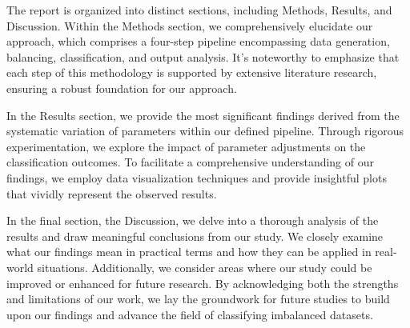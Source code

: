 The report is organized into distinct sections, including Methods, Results, and Discussion. Within the Methods section, we comprehensively elucidate our approach, which comprises a four-step pipeline encompassing data generation, balancing, classification, and output analysis. It’s noteworthy to emphasize that each step of this methodology is supported by extensive literature research, ensuring a robust foundation for our approach.

In the Results section, we provide the most significant findings derived from the systematic variation of parameters within our defined pipeline. Through rigorous experimentation, we explore the impact of parameter adjustments on the classification outcomes. To facilitate a comprehensive understanding of our findings, we employ data visualization techniques and provide insightful plots that vividly represent the observed results.

In the final section, the Discussion, we delve into a thorough analysis of the results and draw meaningful conclusions from our study. We closely examine what our findings mean in practical terms and how they can be applied in real-world situations. Additionally, we consider areas where our study could be improved or enhanced for future research. By acknowledging both the strengths and limitations of our work, we lay the groundwork for future studies to build upon our findings and advance the field of classifying imbalanced datasets. 



 
